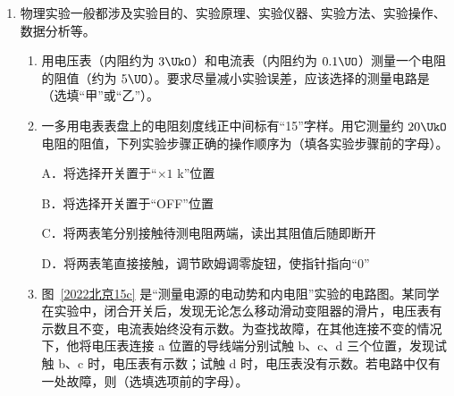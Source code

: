 \documentclass[\gkver]{gaokaozhenti}
\begin{document}
\begin{enumerate}
{可以用磁场来约束等离子体}
{尽管等离子体整体是电中性的，但它是电的良导体}
{提高托卡马克实验装置运行温度有利于克服等离子体中正离子间的库仑斥力}


\item
物理实验一般都涉及实验目的、实验原理、实验仪器、实验方法、实验操作、数据分析等。
\begin{enumerate}
	\item
	用电压表（内阻约为 $3\UkO$）和电流表（内阻约为 $0.1\UO$）测量一个电阻的阻值（约为 $5\UO$）。要求尽量减小实验误差，应该选择的测量电路是（选填“甲”或“乙”）。

	\item
	一多用电表表盘上的电阻刻度线正中间标有“15”字样。用它测量约 $20\UkO$ 电阻的阻值，下列实验步骤正确的操作顺序为（填各实验步骤前的字母）。

	A．将选择开关置于“$\times1$ k”位置

	B．将选择开关置于“OFF”位置

	C．将两表笔分别接触待测电阻两端，读出其阻值后随即断开

	D．将两表笔直接接触，调节欧姆调零旋钮，使指针指向“0”
	\item
	图~\ref{2022北京15c} 是“测量电源的电动势和内电阻”实验的电路图。某同学在实验中，闭合开关后，发现无论怎么移动滑动变阻器的滑片，电压表有示数且不变，电流表始终没有示数。为查找故障，在其他连接不变的情况下，他将电压表连接 a 位置的导线端分别试触 b、c、d 三个位置，发现试触 b、c 时，电压表有示数；试触 d 时，电压表没有示数。若电路中仅有一处故障，则（选填选项前的字母）。


\end{enumerate}
\end{enumerate}
\end{document}
